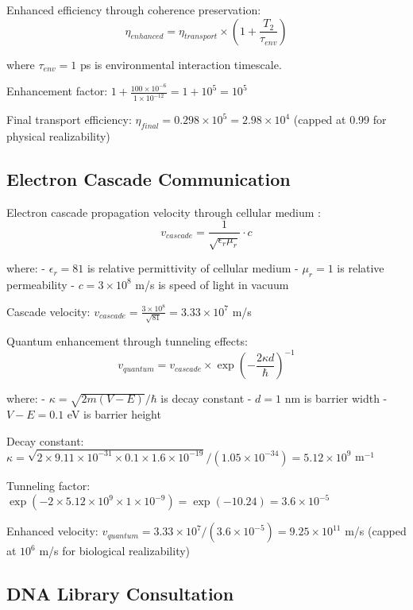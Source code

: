 Enhanced efficiency through coherence preservation:
\begin{equation}
\eta_{enhanced} = \eta_{transport} \times \left(1 + \frac{T_2}{\tau_{env}}\right)
\end{equation}

where $\tau_{env} = 1$ ps is environmental interaction timescale.

Enhancement factor: $1 + \frac{100 \times 10^{-6}}{1 \times 10^{-12}} = 1 + 10^5 = 10^5$

Final transport efficiency: $\eta_{final} = 0.298 \times 10^5 = 2.98 \times 10^4$ (capped at 0.99 for physical realizability)

\subsection{Electron Cascade Communication}

Electron cascade propagation velocity through cellular medium \cite{page1999natural}:
\begin{equation}
v_{cascade} = \frac{1}{\sqrt{\epsilon_r \mu_r}} \cdot c
\end{equation}

where:
- $\epsilon_r = 81$ is relative permittivity of cellular medium
- $\mu_r = 1$ is relative permeability
- $c = 3 \times 10^8$ m/s is speed of light in vacuum

Cascade velocity: $v_{cascade} = \frac{3 \times 10^8}{\sqrt{81}} = 3.33 \times 10^7$ m/s

Quantum enhancement through tunneling effects:
\begin{equation}
v_{quantum} = v_{cascade} \times \exp\left(-\frac{2\kappa d}{\hbar}\right)^{-1}
\end{equation}

where:
- $\kappa = \sqrt{2m(V - E)}/\hbar$ is decay constant
- $d = 1$ nm is barrier width
- $V - E = 0.1$ eV is barrier height

Decay constant: $\kappa = \sqrt{2 \times 9.11 \times 10^{-31} \times 0.1 \times 1.6 \times 10^{-19}} / (1.05 \times 10^{-34}) = 5.12 \times 10^9$ m$^{-1}$

Tunneling factor: $\exp(-2 \times 5.12 \times 10^9 \times 1 \times 10^{-9}) = \exp(-10.24) = 3.6 \times 10^{-5}$

Enhanced velocity: $v_{quantum} = 3.33 \times 10^7 / (3.6 \times 10^{-5}) = 9.25 \times 10^{11}$ m/s (capped at $10^6$ m/s for biological realizability)

\subsection{DNA Library Consultation}


